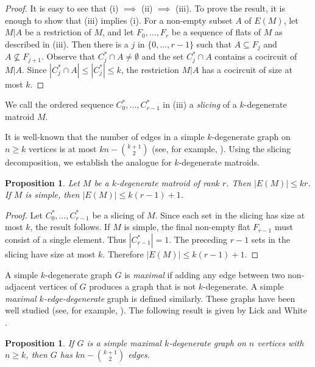 \documentclass{amsart}
\newtheorem{proposition}[theorem]{Proposition}
\theoremstyle{definition}
\theoremstyle{remark}
\numberwithin{equation}{section}
\begin{document}
\begin{proof}
It is easy to see that (i) $\implies$ (ii) $\implies$ (iii). To prove the result, it is enough to show that (iii) implies (i). For a non-empty subset $A$ of $E(M)$, let $M|A$ be a restriction of $M$, and let $F_0 ,\ldots, F_r$ be a sequence of flats of $M$ as described in (iii). Then there is a $j$ in $\{0, \ldots, r-1\}$ such that $A \subseteq F_j$ and $A \not\subseteq F_{j+1}$. Observe that $C^*_j\cap A \neq \emptyset$ and the set $C^*_j \cap A$ contains a cocircuit of $M|A$. Since $|C^*_j \cap A| \le |C^*_j| \le k$, the restriction $M|A$ has a cocircuit of size at most $k$.
\end{proof}

We call the ordered sequence $C^*_0, \ldots, C^*_{r-1}$ in (iii) a \textit{slicing} of a $k$-degenerate matroid $M$.

It is well-known that the number of edges in a simple $k$-degenerate graph on $n \geq k$ vertices is at most $kn - \binom{k+1}{2}$ (see, for example, \cite{lickwhite}). Using the slicing decomposition, we establish the analogue for $k$-degenerate matroids.  

\begin{proposition}
\label{prop: size_bound}
Let $M$ be a $k$-degenerate matroid of rank $r$. Then $|E(M)|\leq kr$. If $M$ is simple, then $|E(M)| \leq k(r-1)+1$. 
\end{proposition}

\begin{proof}
Let $C^*_0, \ldots, C^*_{r-1}$ be a slicing of $M$.
Since each set in the slicing has size at most $k$, the result follows. If $M$ is simple, the final non-empty flat $F_{r-1}$ must consist of a single element. Thus $|C^*_{r-1}| = 1$. The preceding $r-1$ sets in the slicing have size at most $k$. Therefore $|E(M)| \le k(r-1) + 1$.
\end{proof}

A simple $k$-degenerate graph $G$ is \textit{maximal} if adding any edge between two non-adjacent vertices of $G$ produces a graph that is not $k$-degenerate. A simple \textit{maximal $k$-edge-degenerate} graph is defined similarly. These graphs have been well studied (see, for example, \cite{lai_90, mader_71}). The following result is given by Lick and White \cite[Corollary~1]{lickwhite}. 

\begin{proposition}
\label{prop: lick_white_maximal_k_degen}
If $G$ is a simple maximal $k$-degenerate graph on $n$ vertices with $n\geq k$, then $G$ has $kn-\binom{k+1}{2}$ edges.
\end{proposition} 
\end{document}
